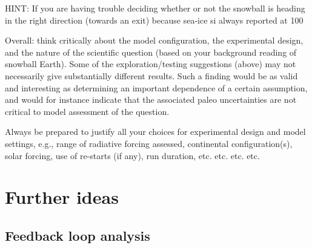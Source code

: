 \documentclass[11pt,fleqn]{book} %
\begin{document}
HINT: If you are having trouble deciding whether or not the snowball is heading in the right direction (towards an exit) because sea-ice si always reported at 100%

Overall: think critically about the model configuration, the experimental design, and the nature of the scientific question (based on your background reading of snowball Earth). Some of the exploration/testing suggestions (above) may not necessarily give substantially different results. Such a finding would be as valid and interesting as determining an important dependence of a certain assumption, and would for instance indicate that the associated paleo uncertainties are not critical to model assessment of the question.

Always be prepared to justify all your choices for experimental design and model settings, e.g., range of radiative forcing assessed, continental configuration(s), solar forcing, use of re-starts (if any), run duration, etc. etc. etc. etc.


\newpage


\section{Further ideas}


\subsection{Feedback loop analysis}
\end{document}
